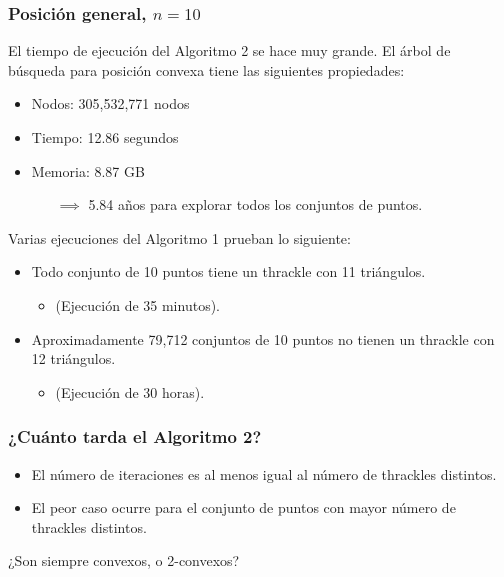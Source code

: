 \documentclass{beamer}
\begin{document}

\begin{frame}
  \frametitle{Posición general, $n=10$}
  El tiempo de ejecución del Algoritmo 2 se hace muy grande. El árbol de
  búsqueda para posición convexa tiene las siguientes propiedades:
  \begin{itemize}
    \item Nodos: 305,532,771 nodos
    \item Tiempo: 12.86 segundos
    \item Memoria: 8.87 GB
      \begin{itemize}[leftmargin=1.5cm]
        \item[$\implies$] 5.84 años para explorar todos los conjuntos de puntos.
      \end{itemize}
  \end{itemize}
  \vspace{0.3cm}
  Varias ejecuciones del Algoritmo 1 prueban lo siguiente:
  \begin{itemize}
    \item Todo conjunto de 10 puntos tiene un thrackle con 11 triángulos.
      \begin{itemize}[leftmargin=1cm]
        \item (Ejecución de 35 minutos).
      \end{itemize}
    \item Aproximadamente 79,712 conjuntos de 10 puntos no tienen un thrackle con 12 triángulos.
      \begin{itemize}[leftmargin=1cm]
        \item (Ejecución de 30 horas).
      \end{itemize}
  \end{itemize}
\end{frame}

\begin{frame}
  \frametitle{¿Cuánto tarda el Algoritmo 2?}
  \begin{itemize}
  \item El número de iteraciones es al menos igual al número de thrackles
    distintos.
  \item El peor caso ocurre para el conjunto de puntos con mayor número de
    thrackles distintos.
  \end{itemize}
      \begin{figure}[htb]
        \centering
        \def\svgwidth{10cm}
        
      \end{figure}
  ¿Son siempre convexos, o 2-convexos?
\end{frame}
\end{document}
